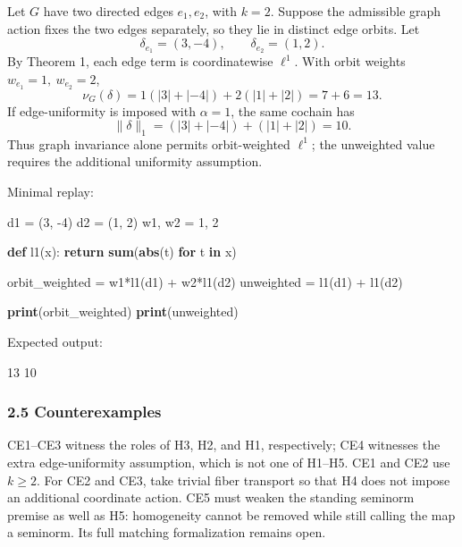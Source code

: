 \documentclass[
  11pt,
]{article}
\newenvironment{Shaded}{\begin{snugshade}}{\end{snugshade}}
\newcommand{\BuiltInTok}[1]{\textcolor[rgb]{0.39,0.29,0.61}{\textbf{#1}}}
\newcommand{\ControlFlowTok}[1]{\textcolor[rgb]{0.12,0.11,0.11}{\textbf{#1}}}
\newcommand{\DecValTok}[1]{\textcolor[rgb]{0.69,0.50,0.00}{#1}}
\newcommand{\KeywordTok}[1]{\textcolor[rgb]{0.12,0.11,0.11}{\textbf{#1}}}
\newcommand{\NormalTok}[1]{\textcolor[rgb]{0.12,0.11,0.11}{#1}}
\newcommand{\OperatorTok}[1]{\textcolor[rgb]{0.12,0.11,0.11}{#1}}
\begin{document}
Let \(G\) have two directed edges \(e_1,e_2\), with \(k=2\). Suppose the
admissible graph action fixes the two edges separately, so they lie in
distinct edge orbits. Let \[
\delta_{e_1}=(3,-4),\qquad \delta_{e_2}=(1,2).
\] By Theorem 1, each edge term is coordinatewise \(\ell^1\). With orbit
weights \(w_{e_1}=1,\ w_{e_2}=2\), \[
\nu_G(\delta) = 1(|3|+|-4|)+2(|1|+|2|) = 7+6 = 13.
\] If edge-uniformity is imposed with \(\alpha=1\), the same cochain has
\[
\|\delta\|_1=(|3|+|-4|)+(|1|+|2|)=10.
\] Thus graph invariance alone permits orbit-weighted \(\ell^1\); the
unweighted value requires the additional uniformity assumption.

Minimal replay:

\begin{Shaded}
\begin{Highlighting}[]
\NormalTok{d1 }\OperatorTok{=}\NormalTok{ (}\DecValTok{3}\NormalTok{, }\OperatorTok{{-}}\DecValTok{4}\NormalTok{)}
\NormalTok{d2 }\OperatorTok{=}\NormalTok{ (}\DecValTok{1}\NormalTok{, }\DecValTok{2}\NormalTok{)}
\NormalTok{w1, w2 }\OperatorTok{=} \DecValTok{1}\NormalTok{, }\DecValTok{2}

\KeywordTok{def}\NormalTok{ l1(x):}
    \ControlFlowTok{return} \BuiltInTok{sum}\NormalTok{(}\BuiltInTok{abs}\NormalTok{(t) }\ControlFlowTok{for}\NormalTok{ t }\KeywordTok{in}\NormalTok{ x)}

\NormalTok{orbit\_weighted }\OperatorTok{=}\NormalTok{ w1}\OperatorTok{*}\NormalTok{l1(d1) }\OperatorTok{+}\NormalTok{ w2}\OperatorTok{*}\NormalTok{l1(d2)}
\NormalTok{unweighted }\OperatorTok{=}\NormalTok{ l1(d1) }\OperatorTok{+}\NormalTok{ l1(d2)}

\BuiltInTok{print}\NormalTok{(orbit\_weighted)}
\BuiltInTok{print}\NormalTok{(unweighted)}
\end{Highlighting}
\end{Shaded}

Expected output:

\begin{Shaded}
\begin{Highlighting}[]
\NormalTok{13}
\NormalTok{10}
\end{Highlighting}
\end{Shaded}

\hypertarget{counterexamples}{%
\subsubsection{2.5 Counterexamples}\label{counterexamples}}

CE1--CE3 witness the roles of H3, H2, and H1, respectively; CE4
witnesses the extra edge-uniformity assumption, which is not one of
H1--H5. CE1 and CE2 use \(k\ge2\). For CE2 and CE3, take trivial fiber
transport so that H4 does not impose an additional coordinate action.
CE5 must weaken the standing seminorm premise as well as H5: homogeneity
cannot be removed while still calling the map a seminorm. Its full
matching formalization remains open.
\end{document}
